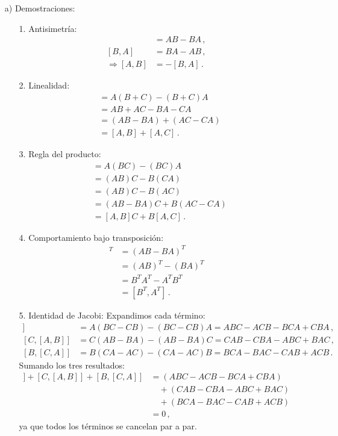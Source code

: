 \documentclass{article}
\begin{document}
\begin{enumerate}
\item[a)] Demostraciones:

\begin{itemize}
\item[1.] Antisimetría:
\begin{align*}
[A,B] &= AB - BA\,,\\
[B,A] &= BA - AB\,,\\
\Rightarrow [A,B] &= -[B,A]\,.
\end{align*}

\item[2.] Linealidad:
\begin{align*}
[A,B+C] &= A(B+C) - (B+C)A\\
&= AB + AC - BA - CA\\
&= (AB - BA) + (AC - CA)\\
&= [A,B] + [A,C]\,.
\end{align*}

\item[3.] Regla del producto:
\begin{align*}
[A,BC] &= A(BC) - (BC)A\\
&= (AB)C - B(CA)\\
&= (AB)C - B(AC)\\
&= (AB - BA)C + B(AC - CA)\\
&= [A,B]C + B[A,C]\,.
\end{align*}

\item[4.] Comportamiento bajo transposición:
\begin{align*}
[A,B]^T &= (AB - BA)^T\\
&= (AB)^T - (BA)^T\\
&= B^T A^T - A^T B^T\\
&= [B^T, A^T]\,.
\end{align*}

\item[5.] Identidad de Jacobi:
Expandimos cada término:
\begin{align*}
[A,[B,C]] &= A(BC - CB) - (BC - CB)A = ABC - ACB - BCA + CBA\,,\\
[C,[A,B]] &= C(AB - BA) - (AB - BA)C = CAB - CBA - ABC + BAC\,,\\
[B,[C,A]] &= B(CA - AC) - (CA - AC)B = BCA - BAC - CAB + ACB\,.
\end{align*}
Sumando los tres resultados:
\begin{align*}
[A,[B,C]] + [C,[A,B]] + [B,[C,A]] &= (ABC - ACB - BCA + CBA) \\
&\quad + (CAB - CBA - ABC + BAC) \\
&\quad + (BCA - BAC - CAB + ACB)\\
&= 0\,,
\end{align*}
ya que todos los términos se cancelan par a par.
\end{itemize}
\end{enumerate}
\end{document}
